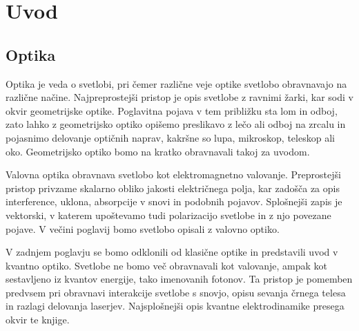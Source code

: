 
\chapter{Uvod}

\section{Optika}
Optika je veda o svetlobi, pri čemer različne veje optike svetlobo
obravnavajo na različne načine. Najpreprostejši pristop je 
opis svetlobe z ravnimi žarki, kar sodi v okvir geometrijske optike. 
Poglavitna pojava v tem približku sta lom in odboj, 
zato lahko z geometrijsko optiko opišemo preslikavo z lečo ali 
odboj na zrcalu in pojasnimo delovanje optičnih naprav, kakršne so 
lupa, mikroskop, teleskop ali oko. Geometrijsko optiko bomo na kratko
obravnavali takoj za uvodom.

Valovna optika obravnava svetlobo kot elektromagnetno valovanje. Preprostejši
pristop privzame skalarno obliko jakosti električnega polja, kar zadošča
za opis interference, uklona, absorpcije v snovi in podobnih pojavov. Splošnejši
zapis je vektorski, v katerem upoštevamo tudi polarizacijo svetlobe in 
z njo povezane pojave. V večini poglavij bomo svetlobo opisali
z valovno optiko. 

V zadnjem poglavju se bomo odklonili od klasične optike in
predstavili uvod v kvantno optiko. Svetlobe ne bomo več obravnavali  
kot valovanje, ampak kot sestavljeno iz kvantov energije, tako 
imenovanih fotonov. Ta pristop je pomemben predvsem  
pri obravnavi interakcije svetlobe s snovjo, opisu sevanja 
črnega telesa in razlagi delovanja laserjev. Najsplošnejši opis 
kvantne elektrodinamike presega okvir te knjige. 

